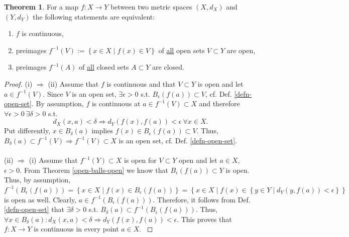 \documentclass[12pt, a4paper]{article}
\numberwithin{equation}{section}
\theoremstyle{definition}
\theoremstyle{definition}
\newtheorem{theorem}[thm]{Theorem}
\begin{document}
	\begin{theorem}\label{thrm:preimages_continuous_functions}
		For a map $f: X\rightarrow Y$ between two metric spaces $\left(X, d_{X} \right)$ and $\left(Y, d_{Y} \right)$ the following statements are equivalent: 
		\begin{enumerate}[label = (\roman*)]
			\item $f$ is continuous,
			\item preimages $f^{-1}(V) := \left\{ x\in X\mid f\left(x\right) \in V \right\}$ of \underline{all} open sets $V\subset Y$ are open,  
			\item preimages $f^{-1}(A)$ of \underline{all} closed sets $A\subset Y$ are closed. 	
		\end{enumerate}
	\end{theorem}
 
	\begin{proof}
		(i) $\Rightarrow$ (ii) Assume that $f$ is continuous and that $V\subset Y$ is open and let $a\in f^{-1}\left( V\right)$. Since $V$ is an open set, $\exists \epsilon > 0$ s.t. $B_{\epsilon}\left( f\left(a\right) \right)\subset V$, cf. Def. \ref{defn-open-set}. By assumption, $f$ is continuous at $a\in f^{-1}\left(V\right)\subset X$ and therefore $\forall \epsilon > 0 \ \exists \delta > 0$ s.t. 
		$$d_{X}\left(x, a\right) < \delta\Rightarrow d_{Y}\left(f\left(x\right), f\left(a\right)\right) < \epsilon \ \forall x\in X.$$ 
		Put differently, $x\in B_{\delta}\left( a\right)$ implies $f\left(x\right) \in B_{\epsilon}\left( f\left(a\right) \right) \subset V$. Thus, $B_{\delta}(a) \subset f^{-1}(V) \Rightarrow f^{-1}(V) \subset X$ is an open set, cf. Def. \ref{defn-open-set}. 
		\\ 
		\\ 
		(ii) $\Rightarrow$ (i) Assume that $f^{-1}\left(Y\right) \subset X$ is open for $V\subset Y$ open and let $a\in X$, $\epsilon > 0$. From Theorem \ref{open-balls-open} we know that $B_{\epsilon}\left(f\left(a\right)\right)\subset Y$ is open. Thus, by assumption, $f^{-1}\left( B_{\epsilon}\left( f\left(a\right) \right) \right) = \left\{ x\in X \mid f\left( x \right) \in B_{\epsilon}\left( f\left(a\right) \right) \right\} = \left\{ x\in X \mid f\left(x\right) \in \left\{ y\in Y\mid d_Y\left( y, f\left(a\right) \right) < \epsilon \right\}\right\}$ is open as well. Clearly, $a\in f^{-1}\left( B_{\epsilon}\left( f\left(a\right) \right) \right)$. Therefore, it follows from Def. \ref{defn-open-set} that $\exists\delta > 0$ s.t. $B_{\delta}(a) \subset f^{-1}\left( B_{\epsilon}\left( f\left(a\right) \right) \right)$. Thus, $\forall x\in B_{\delta}(a): d_{X}\left( x, a \right) < \delta \Rightarrow d_Y\left(f\left(x\right), f\left(a\right)\right) < \epsilon$. This proves that $f: X\rightarrow Y$ is continuous in every point $a\in X$. \cite{cont-functions-open-sets}   

\end{proof}
\end{document}
